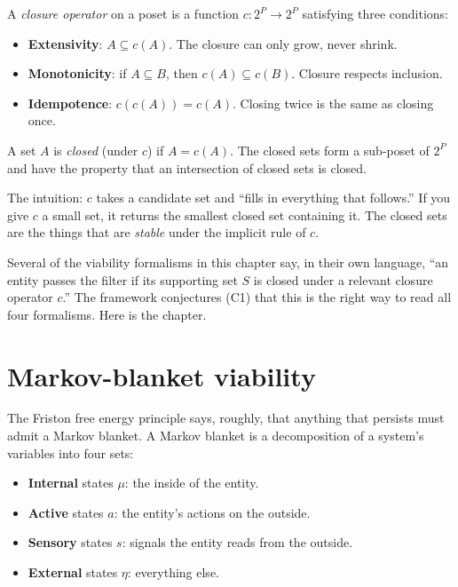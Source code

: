 A \emph{closure operator} on a poset is a function $c : 2^P \to 2^P$
satisfying three conditions:

\begin{itemize}[leftmargin=1.5em,itemsep=2pt]
  \item \textbf{Extensivity}: $A \subseteq c(A)$. The closure can only
    grow, never shrink.
  \item \textbf{Monotonicity}: if $A \subseteq B$, then $c(A) \subseteq
    c(B)$. Closure respects inclusion.
  \item \textbf{Idempotence}: $c(c(A)) = c(A)$. Closing twice is the
    same as closing once.
\end{itemize}

A set $A$ is \emph{closed} (under $c$) if $A = c(A)$. The closed sets
form a sub-poset of $2^P$ and have the property that an intersection of
closed sets is closed.

The intuition: $c$ takes a candidate set and ``fills in everything that
follows.'' If you give $c$ a small set, it returns the smallest closed
set containing it. The closed sets are the things that are
\emph{stable} under the implicit rule of $c$.

Several of the viability formalisms in this chapter say, in their own
language, ``an entity passes the filter if its supporting set $S$ is
closed under a relevant closure operator $c$.'' The framework
conjectures (C1) that this is the right way to read all four
formalisms. Here is the chapter.

\section{Markov-blanket viability}

The Friston free energy principle says, roughly, that anything that
persists must admit a Markov blanket. A Markov blanket is a
decomposition of a system's variables into four sets:

\begin{itemize}[leftmargin=1.5em,itemsep=2pt]
  \item \textbf{Internal} states $\mu$: the inside of the entity.
  \item \textbf{Active} states $a$: the entity's actions on the
    outside.
  \item \textbf{Sensory} states $s$: signals the entity reads from the
    outside.
  \item \textbf{External} states $\eta$: everything else.
\end{itemize}

